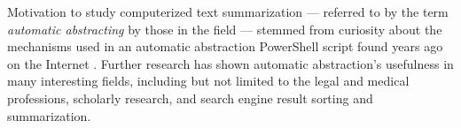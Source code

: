 Motivation to study computerized text summarization --- referred to by the term {\em automatic abstracting}  by those in the field --- stemmed from curiosity about the mechanisms used in an automatic abstraction PowerShell script found years ago on the Internet \cite{PSScript}. Further research has shown automatic abstraction's usefulness in many interesting fields, including but not limited to the legal and medical professions, scholarly research, and search engine result sorting and summarization.